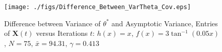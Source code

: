 \documentclass[onecolumn, draft, 12pt]{IEEEtran}
\newcommand{\xbar}{\bar{x}}
\newcommand{\cval}{\ensuremath{\theta^{*}}}
\begin{document}
\begin{figure}[tb]
\begin{minipage}{1\textwidth}
\centering
\begin{center}
\texttt{[image: ./figs/Difference\_Between\_VarTheta\_Cov.eps]}
\caption{Difference between Variance of $\cval$ and Asymptotic Variance, Entries of $\mathbf{X}(t)$ versus Iterations $t$: $h(x)=x$, $f(x)=3 \tan^{-1}(0.05 x)$, $N=75$, $\xbar=94.31$, $\gamma=0.413$}\label{fig:Difference_Between_VarTheta_Cov}
\end{center}
\end{minipage}
\end{figure}
\end{document}
